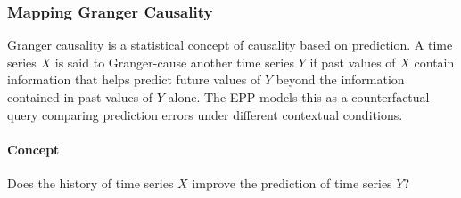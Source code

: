 
\subsubsection{Mapping Granger Causality}
\label{subsec:formalization_mapping_granger}

Granger causality is a statistical concept of causality based on prediction. A time series \(X\) is said to Granger-cause another time series \(Y\) if past values of \(X\) contain information that helps predict future values of \(Y\) beyond the information contained in past values of \(Y\) alone. The EPP models this as a counterfactual query comparing prediction errors under different contextual conditions.

\paragraph{Concept}
Does the history of time series \(X\) improve the prediction of time series \(Y\)?


